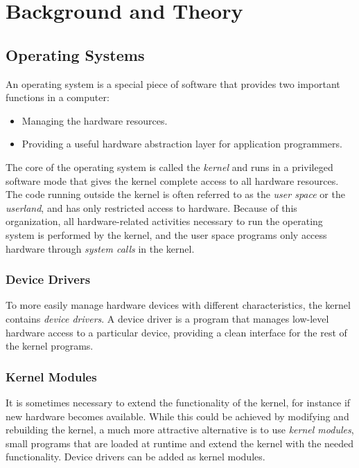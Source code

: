 \chapter{Background and Theory}



\section{Operating Systems}
An operating system is a special piece of software that provides two important functions in a computer:
\begin{itemize}
  \item Managing the hardware resources.
  \item Providing a useful hardware abstraction layer for application programmers.
\end{itemize}
The core of the operating system is called the \emph{kernel} and runs in a privileged software mode that gives the kernel complete access to all hardware resources. The code running outside the kernel is often referred to as the \emph{user space} or the \emph{userland}, and has only restricted access to hardware. Because of this organization, all hardware-related activities necessary to run the operating system is performed by the kernel, and the user space programs only access hardware through \emph{system calls} in the kernel.\cite{modern-operating-systems}

\subsection{Device Drivers}
To more easily manage hardware devices with different characteristics, the kernel contains \emph{device drivers}. A device driver is a program that manages low-level hardware access to a particular device, providing a clean interface for the rest of the kernel programs.

\subsection{Kernel Modules}\label{sec:kernel-modules}
It is sometimes necessary to extend the functionality of the kernel, for instance if new hardware becomes available. While this could be achieved by modifying and rebuilding the kernel, a much more attractive alternative is to use \emph{kernel modules}, small programs that are loaded at runtime and extend the kernel with the needed functionality. Device drivers can be added as kernel modules.

